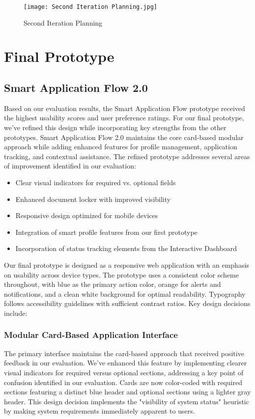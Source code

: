 \documentclass[
	letterpaper, %
]{jdf}
\begin{document}
\begin{sloppypar}
\begin{figure}
    \centering
    \texttt{[image: Second Iteration Planning.jpg]}
    \caption{Second Iteration Planning}
    \label{fig:enter-label}
\end{figure}


\newpage
\section{Final Prototype}
\subsection{Smart Application Flow 2.0}
Based on our evaluation results, the Smart Application Flow prototype received the highest usability scores and user preference ratings. For our final prototype, we've refined this design while incorporating key strengths from the other prototypes. Smart Application Flow 2.0 maintains the core card-based modular approach while adding enhanced features for profile management, application tracking, and contextual assistance.
The refined prototype addresses several areas of improvement identified in our evaluation:
\begin{itemize}
    \item Clear visual indicators for required vs. optional fields
    \item Enhanced document locker with improved visibility
    \item Responsive design optimized for mobile devices
    \item Integration of smart profile features from our first prototype
    \item Incorporation of status tracking elements from the Interactive Dashboard
\end{itemize}

Our final prototype is designed as a responsive web application with an emphasis on usability across device types. The prototype uses a consistent color scheme throughout, with blue as the primary action color, orange for alerts and notifications, and a clean white background for optimal readability. Typography follows accessibility guidelines with sufficient contrast ratios.
Key design decisions include:
\subsubsection{Modular Card-Based Application Interface}
The primary interface maintains the card-based approach that received positive feedback in our evaluation. We've enhanced this feature by implementing clearer visual indicators for required versus optional sections, addressing a key point of confusion identified in our evaluation. Cards are now color-coded with required sections featuring a distinct blue header and optional sections using a lighter gray header. This design decision implements the "visibility of system status" heuristic by making system requirements immediately apparent to users.


\end{sloppypar}
\end{document}
